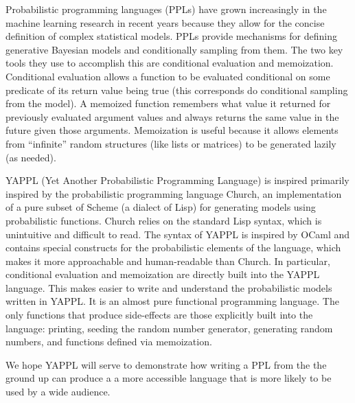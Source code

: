 Probabilistic programming languages (PPLs) have grown increasingly in the machine learning research in recent years because they allow for the concise definition of complex statistical models. PPLs provide mechanisms for defining generative Bayesian models and conditionally sampling from them. The two key tools they use to accomplish this are conditional evaluation and memoization. Conditional evaluation allows a function to be evaluated conditional on some predicate of its return value being true (this corresponds do conditional sampling from the model). A memoized function remembers what value it returned for previously evaluated argument values and always returns the same value in the future given those arguments. Memoization is useful because it allows elements from ``infinite'' random structures (like lists or matrices) to be generated lazily (as needed). 

YAPPL (Yet Another Probabilistic Programming Language) is inspired primarily inspired by the probabilistic programming language Church, an implementation of a pure subset of Scheme (a dialect of Lisp) for generating models using probabilistic functions. Church relies on the standard Lisp syntax, which is unintuitive and difficult to read. The syntax of YAPPL is inspired by OCaml and contains special constructs for the probabilistic elements of the language, which makes it more approachable and human-readable than Church. In particular, conditional evaluation and memoization are directly built into the YAPPL language. This makes easier to write and understand the probabilistic models written in YAPPL. It is an almost pure functional programming language. The only functions that produce side-effects are those explicitly built into the language: printing, seeding the random number generator, generating random numbers, and functions defined via memoization. 

We hope YAPPL will serve to demonstrate how writing a PPL from the the ground up can produce a  a more accessible language that is more likely to be used by a wide audience. 
 

